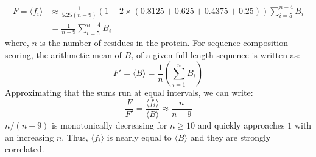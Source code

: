 \begin{align*} 
    F = \langle f_i\rangle &\approx \frac{1}{5.25(n-9)} (1 + 2\times (0.8125+0.625 + 0.4375 + 0.25))\sum_{i=5}^{n-4}B_i\\
    &= \frac{1}{n-9}\sum_{i=5}^{n-4}B_i
\end{align*}
where, $n$ is the number of residues in the protein. For sequence composition scoring, the arithmetic mean of $B_i$ of a given full-length sequence is written as:
\begin{equation*}
F' = \langle B \rangle = \frac{1}{n}(\sum_{i=1}^{n} B_i)
\end{equation*}
Approximating that the sums run at equal intervals, we can write:
\begin{equation*}
\frac{F}{F'} = \frac{\langle f_i\rangle}{\langle B\rangle} \approx \frac{n}{n-9}
\end{equation*}
$n/(n-9)$ is monotonically decreasing for $n \geq 10$ and quickly approaches $1$ with an increasing $n$. Thus, $\langle f_i\rangle$ is nearly equal to $\langle B \rangle$ and they are strongly correlated.

